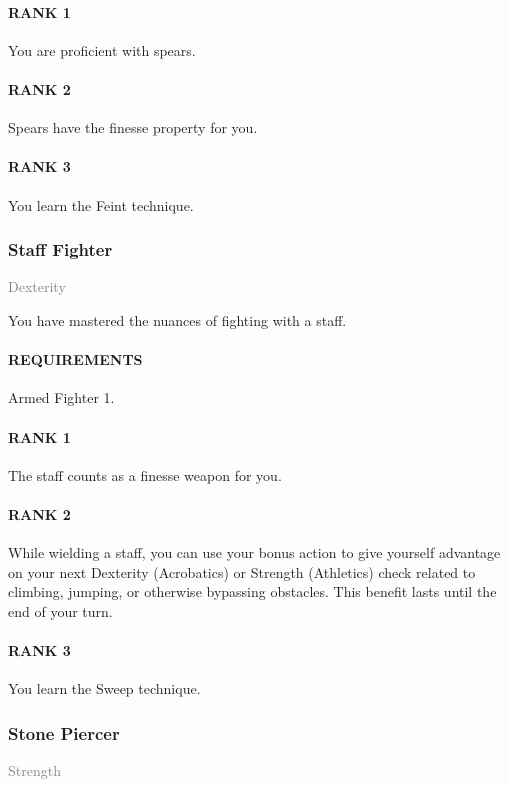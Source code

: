 \paragraph{RANK 1} You are proficient with spears.
\paragraph{RANK 2} Spears have the finesse property for you.
\paragraph{RANK 3} You learn the Feint technique.

\subsubsection{Staff Fighter} \label{feat::stafffighter}
\small{\textcolor{gray}{Dexterity}}

\normalsize
You have mastered the nuances of fighting with a staff.
\paragraph{REQUIREMENTS} Armed Fighter 1.
\paragraph{RANK 1} The staff counts as a finesse weapon for you.
\paragraph{RANK 2} While wielding a staff, you can use your bonus action to give yourself advantage on your next Dexterity (Acrobatics) or Strength (Athletics) check related to climbing, jumping, or otherwise bypassing obstacles.
This benefit lasts until the end of your turn.
\paragraph{RANK 3} You learn the Sweep technique.

\subsubsection{Stone Piercer} \label{feat::stonepiercer}
\small{\textcolor{gray}{Strength}}

